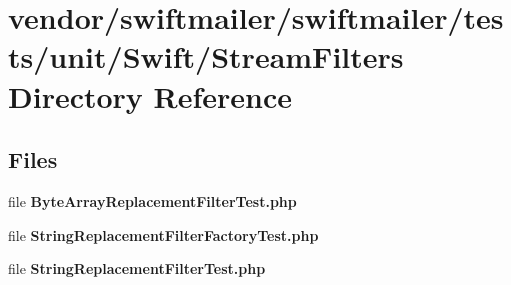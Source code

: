 \section{vendor/swiftmailer/swiftmailer/tests/unit/\+Swift/\+Stream\+Filters Directory Reference}
\label{dir_bf931823a403a2d87eb23f24b4ca6a45}
\subsection*{Files}
\begin{DoxyCompactItemize}
\item 
file {\bf Byte\+Array\+Replacement\+Filter\+Test.\+php}
\item 
file {\bf String\+Replacement\+Filter\+Factory\+Test.\+php}
\item 
file {\bf String\+Replacement\+Filter\+Test.\+php}
\end{DoxyCompactItemize}
